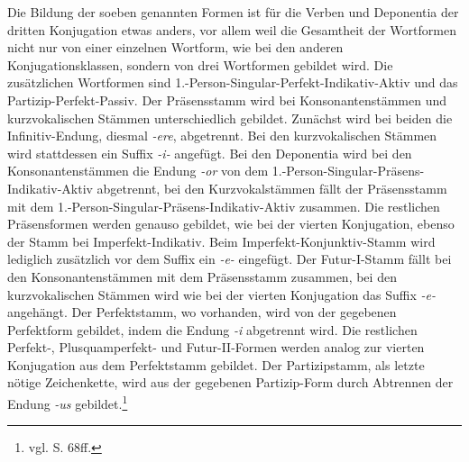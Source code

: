 Die Bildung der soeben genannten Formen ist für die Verben und Deponentia der dritten Konjugation etwas anders, vor allem weil die Gesamtheit der Wortformen nicht nur von einer einzelnen Wortform, wie bei den anderen Konjugationsklassen, sondern von drei Wortformen gebildet wird. Die zusätzlichen Wortformen sind 1.-Person-Singular-Perfekt-Indikativ-Aktiv und das Partizip-Perfekt-Passiv. Der Präsensstamm wird bei Konsonantenstämmen und kurzvokalischen Stämmen unterschiedlich gebildet. Zunächst wird bei beiden die Infinitiv-Endung, diesmal \textit{-ere}, abgetrennt. Bei den kurzvokalischen Stämmen wird stattdessen ein Suffix \textit{-i-} angefügt. Bei den Deponentia wird bei den Konsonantenstämmen die Endung \textit{-or} von dem 1.-Person-Singular-Präsens-Indikativ-Aktiv abgetrennt, bei den Kurzvokalstämmen fällt der Präsensstamm mit dem 1.-Person-Singular-Präsens-Indikativ-Aktiv zusammen. Die restlichen Präsensformen werden genauso gebildet, wie bei der vierten Konjugation, ebenso der Stamm bei Imperfekt-Indikativ. Beim Imperfekt-Konjunktiv-Stamm wird lediglich zusätzlich vor dem Suffix ein \textit{-e-} eingefügt. Der Futur-I-Stamm fällt bei den Konsonantenstämmen mit dem Präsensstamm zusammen, bei den kurzvokalischen Stämmen wird wie bei der vierten Konjugation das Suffix \textit{-e-} angehängt. Der Perfektstamm, wo vorhanden, wird von der gegebenen Perfektform gebildet, indem die Endung \textit{-i} abgetrennt wird. Die restlichen Perfekt-, Plusquamperfekt- und Futur-II-Formen werden analog zur vierten Konjugation aus dem Perfektstamm gebildet. Der Partizipstamm, als letzte nötige Zeichenkette, wird aus der gegebenen Partizip-Form durch Abtrennen der Endung \textit{-us} gebildet.\footnote{vgl. \cite{BAYER-LINDAUER1994} S. 68ff.} \par
